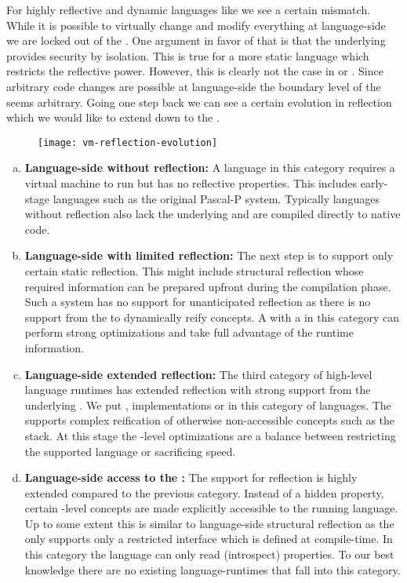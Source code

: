 For highly reflective and dynamic languages like \PH we see a certain mismatch.
While it is possible to virtually change and modify everything at language-side we are locked out of the \VM.
One argument in favor of that is that the underlying \VM provides security by isolation.
This is true for a more static language which restricts the reflective power.
However, this is clearly not the case in \PH or \ST.
Since arbitrary code changes are possible at language-side the boundary level of the \VM seems arbitrary.
Going one step back we can see a certain evolution in reflection which we would like to extend down to the \VM.
%
\begin{figure}[h]
	\centering
	\texttt{[image: vm-reflection-evolution]}
\end{figure}
%
\begin{enumerate}[a), nolistsep]
\item \textbf{Language-side without reflection:} A language in this category requires a virtual machine to run but has no reflective properties.
	This includes early-stage languages such as the original Pascal-P system.
	Typically languages without reflection also lack the underlying \VM and are compiled directly to native code.
	
\item \textbf{Language-side with limited reflection:}
	The next step is to support only certain static reflection.
	This might include structural reflection whose required information can be prepared upfront during the compilation phase.
	Such a system has no support for unanticipated reflection as there is no support from the \VM to dynamically reify concepts.
	A \VM with a \JIT in this category can perform strong optimizations and take full advantage of the runtime information.
	
\item \textbf{Language-side extended reflection:}
	The third category of high-level language runtimes has extended reflection with strong support from the underlying \VM.
	We put \PH, \ST implementations or \Self in this category of languages.
	The \VM supports complex reification of otherwise non-accessible concepts such as the stack.
	At this stage the \VM-level optimizations are a balance between restricting the supported language or sacrificing speed.
	
\item \textbf{Language-side access to the \VM:}
	The \VM support for reflection is highly extended compared to the previous category.
	Instead of a hidden property, certain \VM-level concepts are made explicitly accessible to the running language.
	Up to some extent this is similar to language-side structural reflection as the \VM only supports only a restricted interface which is defined at compile-time.
	In this category the language can only read (introspect) \VM properties.
	To our best knowledge there are no existing language-runtimes that fall into this category.


\end{enumerate}
